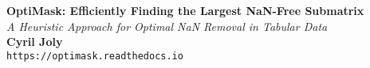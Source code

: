 \documentclass[a0,landscape]{a0poster}
\begin{document}


\begin{minipage}[b]{0.9\linewidth}
	\veryHuge \color{NavyBlue} \textbf{OptiMask: Efficiently Finding the Largest NaN-Free Submatrix}\\ %
	\Huge\textit{A Heuristic Approach for Optimal NaN Removal in Tabular Data}\\[1cm] %
	\huge \textbf{Cyril Joly}\\ %
	\huge \texttt{https://optimask.readthedocs.io}\\
\end{minipage}
%
%

\vspace{1cm} %

\end{document}
